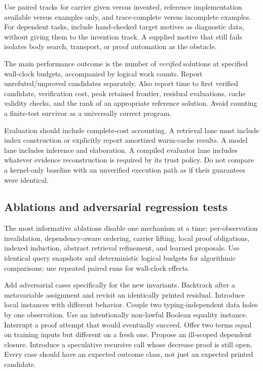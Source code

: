 \documentclass[11pt,a4paper]{article}
\theoremstyle{remark}
\begin{document}
Use paired tracks for carrier given versus invented, reference implementation
available versus examples only, and trace-complete versus incomplete examples.
For dependent tasks, include hand-checked target motives as diagnostic data,
without giving them to the invention track. A supplied motive that still
fails isolates body search, transport, or proof automation as the obstacle.

The main performance outcome is the number of \emph{verified} solutions at
specified wall-clock budgets, accompanied by logical work counts. Report
unrefuted/unproved candidates separately. Also report time to first verified
candidate, verification cost, peak retained frontier, residual evaluations,
cache validity checks, and the rank of an appropriate reference solution.
Avoid counting a finite-test survivor as a universally correct program.

Evaluation should include complete-cost accounting. A retrieval lane must
include index construction or explicitly report amortized warm-cache results.
A model lane includes inference and elaboration. A compiled evaluator lane
includes whatever evidence reconstruction is required by its trust policy.
Do not compare a kernel-only baseline with an unverified execution path as
if their guarantees were identical.

\subsection{Ablations and adversarial regression tests}

The most informative ablations disable one mechanism at a time: per-observation
invalidation, dependency-aware ordering, carrier lifting, local proof
obligations, indexed induction, abstract retrieval refinement, and learned
proposals. Use identical query snapshots and deterministic logical budgets
for algorithmic comparisons; use repeated paired runs for wall-clock effects.

Add adversarial cases specifically for the new invariants. Backtrack after a
metavariable assignment and revisit an identically printed residual. Introduce
local instances with different behavior. Couple two typing-independent data
holes by one observation. Use an intentionally non-lawful Boolean equality
instance. Interrupt a proof attempt that would eventually succeed. Offer two
terms equal on training inputs but different on a fresh one. Propose an
ill-scoped dependent closure. Introduce a speculative recursive call whose
decrease proof is still open. Every case should have an expected outcome
class, not just an expected printed candidate.
\end{document}

